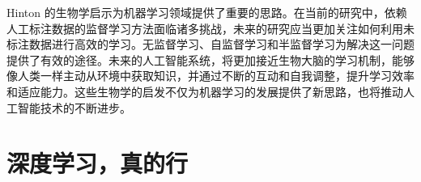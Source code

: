 %
%
%
%

%
%
%

Hinton 的生物学启示为机器学习领域提供了重要的思路。在当前的研究中，依赖人工标注数据的监督学习方法面临诸多挑战，未来的研究应当更加关注如何利用未标注数据进行高效的学习。无监督学习、自监督学习和半监督学习为解决这一问题提供了有效的途径。未来的人工智能系统，将更加接近生物大脑的学习机制，能够像人类一样主动从环境中获取知识，并通过不断的互动和自我调整，提升学习效率和适应能力。这些生物学的启发不仅为机器学习的发展提供了新思路，也将推动人工智能技术的不断进步。

\section{深度学习，真的行}

